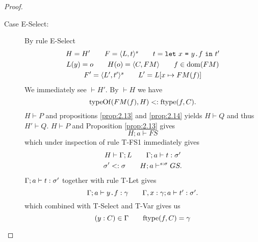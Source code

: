 \begin{proof}
\begin{description}
\begin{description}
\begin{description}
            \item[Case {\sc E-Select}:] By rule {\sc E-Select}
              \begin{equation} \label{eq:eselect1}
                \begin{gathered}
                  H = H' \quad\quad F = \mbox{$\langle L, t \rangle^s$} \quad\quad t =
                  \mbox{\mdseries\texttt{let}~$x$~\texttt{=}~$\mbox{\mdseries$y$\texttt{.}$f$}$~\texttt{in}~$t'$} \\
                  L(y) = o \quad\quad H(o) = \mbox{$\langle C, FM \rangle$} \quad\quad f \in \mbox{$\mathrm{dom}$}(FM)
                  \\
                  F' = \mbox{$\langle L', t' \rangle^s$} \quad\quad L' = L[x \mapsto FM(f)]
                \end{gathered}
              \end{equation}
              We immediately see $\vdash H'$. By $\vdash H$ we have
              \begin{equation} \label{eq:eselect2}
                \mbox{$\mathrm{typeOf}$}(FM(f), H) <: \mbox{$\mathrm{ftype}$}(f, C).
              \end{equation}
              $H \vdash P$ and propositions \ref{prop:2.13} and \ref{prop:2.14} yields
              $H \vdash Q$ and thus $H' \vdash Q$.
              $H \vdash P$ and Proposition \ref{prop:2.13} gives 
              \begin{equation} \label{eq:eselect3}
                H; a \vdash FS
              \end{equation}
              which under inspection of rule {\sc T-FS1} immediately gives
              \begin{equation} \label{eq:eselect4}
                \begin{gathered}
                  H \vdash \Gamma; L \quad\quad \mbox{$\Gamma;a\vdash t:\sigma'$} \\
                  \sigma' <: \sigma \quad\quad H; a \vdash^{s: \sigma} GS.
                \end{gathered}
              \end{equation}
              $\mbox{$\Gamma;a\vdash t:\sigma'$}$ together with rule {\sc T-Let}
              gives
              \begin{equation} \label{eq:eselect5}
                \mbox{$\Gamma;a\vdash\mbox{\mdseries$y$\texttt{.}$f$}:\gamma$} \quad\quad
                \mbox{$\Gamma, x: \gamma;a\vdash t':\sigma'$}.
              \end{equation}
              which combined with {\sc T-Select} and {\sc T-Var} gives us
              \begin{equation} \label{eq:eselect6}
                (y: C) \in \Gamma \andalso \ftype(f, C) = \gamma

\end{equation}
\end{description}
\end{description}
\end{description}
\end{proof}

